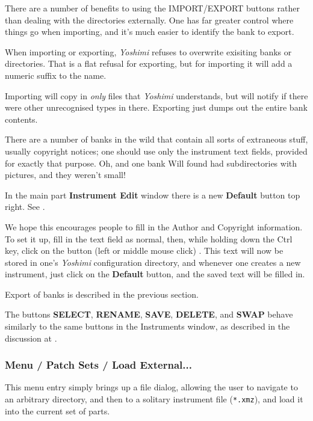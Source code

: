    There are a number of benefits to using the IMPORT/EXPORT buttons
   rather than dealing with the directories externally.
   One has far greater control where things go when
   importing, and it's much easier to identify the bank to export.

   When importing or exporting,
   \textsl{Yoshimi} refuses to overwrite exisiting banks or
   directories. That is a flat refusal for exporting, but for importing it will
   add a numeric suffix to the name.

   Importing will copy in \textsl{only} files that
   \textsl{Yoshimi} understands, but will notify
   if there were other unrecognised types in there.
   Exporting just dumps out the entire bank contents.

   There are a number of banks in the wild that contain all sorts of extraneous
   stuff, usually copyright notices; one should use only the instrument
   text fields, provided for exactly that purpose.
   Oh, and one bank Will found had subdirectories with pictures,
   and they weren't small!

   In the main part \textbf{Instrument Edit} window there is a new
   \textbf{Default} button top right.
   See .

   We hope this encourages people
   to fill in the Author and Copyright information.
   To set it up, fill in the text field as normal,
   then, while holding down the Ctrl key, click on the button
   (left or middle mouse click) . This text will now be stored in
   one's
   \textsl{Yoshimi} configuration directory,
   and whenever one creates a new instrument, just
   click on the \textbf{Default} button, and the saved text will be
   filled in.

   Export of banks is described in the previous section.

   The buttons \textbf{SELECT}, \textbf{RENAME}, \textbf{SAVE},
   \textbf{DELETE}, and \textbf{SWAP} behave similarly to the same buttons in
   the Instruments window, as
   described in the discussion at
   .

\subsubsection{Menu / Patch Sets / Load External...}
\label{subsubsec:menu_patch_sets_load}

   This menu entry simply brings up a file dialog, allowing the user to
   navigate to an arbitrary directory, and then to a solitary instrument file
   (\texttt{*.xmz}), and load it into the current set of parts.

